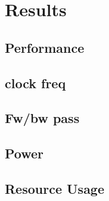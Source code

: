 \chapter{Results}
\section{Performance}
\section{clock freq}
\section{Fw/bw pass}
\section{Power}
\section{Resource Usage}